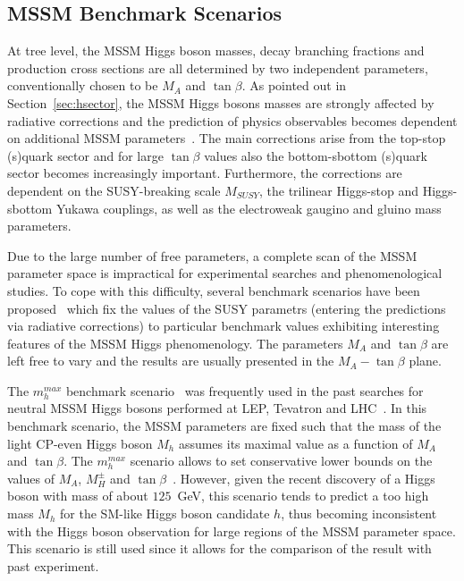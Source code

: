 \subsection{MSSM Benchmark Scenarios} \label{sec:benchmark}
At tree level, the MSSM  Higgs boson masses, decay branching fractions and production cross sections are all determined by two independent parameters,
conventionally chosen to be $M_A$ and $\tan\beta$. As pointed out in Section~\ref{sec:hsector}, 
the MSSM Higgs bosons masses are strongly affected by radiative corrections and the prediction of physics observables becomes 
dependent on additional MSSM parameters~\cite{Higgsm5}.
The main corrections arise from the top-stop (s)quark sector and for large $\tan\beta$ values also the bottom-sbottom (s)quark sector becomes increasingly 
important. Furthermore, the corrections are dependent on the SUSY-breaking scale $M_{SUSY}$, the trilinear Higgs-stop and  
Higgs-sbottom Yukawa couplings, as well as the electroweak gaugino and gluino mass parameters.

Due to the large number of free parameters, a complete scan of the MSSM parameter space is impractical for experimental searches and phenomenological
studies. To cope with this difficulty, several benchmark scenarios have been proposed~\cite{LHCxsec,mhmax2} which fix the 
values of the SUSY parametrs (entering the predictions via radiative corrections)
to particular benchmark values exhibiting interesting features of the MSSM Higgs phenomenology. The parameters 
$M_A$ and $\tan\beta$ are left free to vary and the results are usually presented in the $M_A-\tan\beta$ plane.

The $m_h^{max}$ benchmark scenario~\cite{MSSMmhmax} was  frequently  used  in the past searches for neutral MSSM Higgs bosons performed
at LEP, Tevatron and LHC~\cite{LEPLimits,TevatronLimits1,CMSLimit,ATLASLimit}. 
In this benchmark scenario, the MSSM parameters  are fixed such that the mass of the light CP-even Higgs boson $M_h$ 
assumes its maximal value as a function of $M_A$ and $\tan\beta$. The $m_h^{max}$ scenario allows to set conservative 
lower bounds on the values of $M_A$, $M_H^{\pm}$ and $\tan\beta$~\cite{mhmax2}. However, given the recent discovery of a Higgs
boson with mass of about $125$~GeV, this scenario
tends to predict a too high mass $M_h$ for the SM-like Higgs boson candidate $h$, 
thus becoming inconsistent with the Higgs boson observation for large regions of the MSSM parameter space.
This scenario is still used since it allows for the comparison of the result with past experiment.


